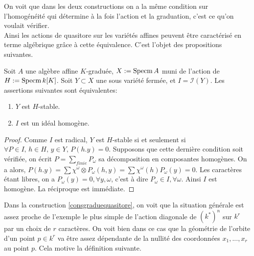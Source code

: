 \begin{cons}
\begin{multicols}{2}
	\columnbreak
	\begin{center}
	\end{center}
\end{multicols}
\end{cons}

On voit que dans les deux constructions on a la même condition sur l'homogénéité qui détermine à la fois l'action et la graduation, c'est ce qu'on voulait vérifier.\\
Ainsi les actions de quasitore sur les variétés affines peuvent être caractérisé en terme algébrique  grâce à cette équivalence. C'est l'objet des propositions suivantes.

\begin{prop}\label{stablehomogene}
Soit $A$ une algèbre affine $K$-graduée, $X:=\operatorname{Specm} A$ muni de l'action de $H:=\operatorname{Specm} k[K]$.  Soit $Y\subset X$ une sous variété fermée, et $I=\mathcal{I}(Y)$. Les assertions suivantes sont équivalentes:
\begin{enumerate}
\item $Y$ est $H$-stable.
\item $I$ est un idéal homogène.
\end{enumerate}
\end{prop}
\begin{proof}
Comme $I$ est radical, $Y$ est $H$-stable si et seulement si $\forall P\in I,\,h\in H,\, y\in Y,\, P(h.y)=0$. Supposons que cette dernière condition soit vérifiée, on écrit $P=\sum_{finie}P_\omega$ sa décomposition en composantes homogènes. On a alors, $P(h.y)=\sum \chi^{\omega}\otimes P_{\omega}(h,y) = \sum \chi^{\omega}(h) P_{\omega}(y)=0$. Les caractères étant libres, on a $P_{\omega}(y)=0, \forall y,\omega$, c'est à dire $P_{\omega}\in I, \forall \omega$. Ainsi $I$ est homogène. La réciproque est immédiate. 
\end{proof}

Dans la construction \ref{consgraduequasitore}, on voit que la situation générale est assez proche de l'exemple le plus simple de l'action diagonale de $(k^*)^n$ sur $k^r$ par un choix de $r$ caractères. On voit bien dans ce cas que la géométrie de l'orbite d'un point $p\in k^r$ va être assez dépendante de la nullité des coordonnées $x_1,..., x_r$ au point $p$. Cela motive la définition suivante.


